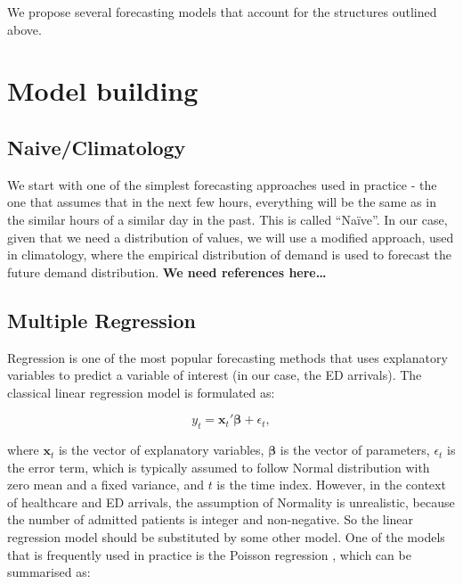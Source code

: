 \documentclass[]{elsarticle} %
\begin{document}
We propose several forecasting models that account for the structures outlined above.

\hypertarget{model}{%
\section{Model building}\label{model}}

\hypertarget{climatology}{%
\subsection{Naive/Climatology}\label{climatology}}

We start with one of the simplest forecasting approaches used in practice - the one that assumes that in the next few hours, everything will be the same as in the similar hours of a similar day in the past. This is called ``Naïve''. In our case, given that we need a distribution of values, we will use a modified approach, used in climatology, where the empirical distribution of demand is used to forecast the future demand distribution. \textbf{We need references here\ldots{}}

\hypertarget{multiple-regression}{%
\subsection{Multiple Regression}\label{multiple-regression}}

Regression is one of the most popular forecasting methods that uses explanatory variables to predict a variable of interest (in our case, the ED arrivals). The classical linear regression model is formulated as:

\begin{equation}
  {y}_t = \mathbf{x}_t' \boldsymbol{\beta} + \epsilon_t ,
\label{eq:linearRegression}
\end{equation}

where \(\mathbf{x}_t\) is the vector of explanatory variables, \(\boldsymbol{\beta}\) is the vector of parameters, \(\epsilon_t\) is the error term, which is typically assumed to follow Normal distribution with zero mean and a fixed variance, and \(t\) is the time index. However, in the context of healthcare and ED arrivals, the assumption of Normality is unrealistic, because the number of admitted patients is integer and non-negative. So the linear regression model should be substituted by some other model. One of the models that is frequently used in practice is the Poisson regression \citep[see for example,][]{mccarthy2008challenge}, which can be summarised as:
\end{document}
